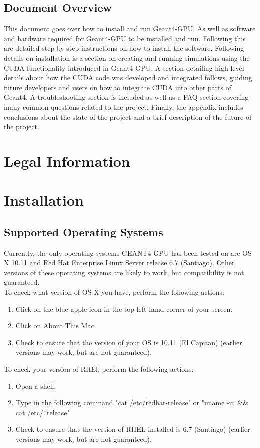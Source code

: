 \documentclass[12pt]{article}
\begin{document}
\subsection{Document Overview} %
This document goes over how to install and run Geant4-GPU. As well as software and hardware required for Geant4-GPU to be installed and run. Following this are detailed step-by-step instructions on how to install the software. Following details on installation is a section on creating and running simulations using the CUDA functionality introduced in Geant4-GPU. A section detailing high level details about how the CUDA code was developed and integrated follows, guiding future developers and users on how to integrate CUDA into other parts of Geant4. A troubleshooting section is included as well as a FAQ section covering many common questions related to the project. Finally, the appendix includes conclusions about the state of the project and a brief description of the future of the project.

\section{Legal Information}	%

\section{Installation} %

\subsection{Supported Operating Systems} %
Currently, the only operating systems GEANT4-GPU has been tested on are OS X 10.11 and  Red Hat Enterprise Linux Server release 6.7 (Santiago). Other versions of these operating systems are likely to work, but compatibility is not guaranteed.\\
To check what version of OS X you have, perform the following actions:
\begin{enumerate}
\item Click on the blue apple icon in the top left-hand corner of your screen.
\item Click on About This Mac.
\item Check to ensure that the version of your OS is 10.11 (El Capitan) (earlier versions may work, but are not guaranteed).
\end{enumerate}
To check your version of RHEl, perform the following actions:
\begin{enumerate}
\item Open a shell.
\item Type in the following command "cat /etc/redhat-release" or "uname -m \&\& cat /etc/*release"
\item Check to ensure that the version of RHEL installed is 6.7 (Santiago) (earlier versions may work, but are not guaranteed).
\end{enumerate}
\end{document}

